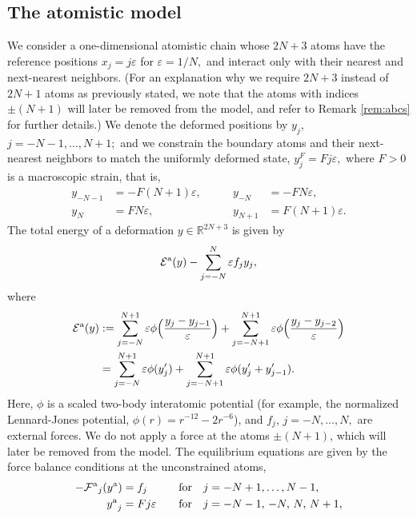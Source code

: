 \documentclass[12pt,reqno]{amsart}
\begin{document}
\subsection{The atomistic model}
\label{sec:model_at}
We consider a one-dimensional atomistic chain whose $2N+3$ atoms have
the reference positions $x_j = j{\varepsilon} $ for ${\varepsilon} = 1/N,$ and interact
only with their nearest and next-nearest neighbors. (For an
explanation why we require $2N+3$ instead of $2N+1$ atoms as
previously stated, we note that the atoms with indices $\pm(N+1)$ will
later be removed from the model, and refer to Remark \ref{rem:abcs}
for further details.) We denote the deformed positions by $y_j$,
$j=-N-1,\dots,N+1;$ and we constrain the boundary atoms and their
next-nearest neighbors to match the uniformly deformed state, $y_j^F =
Fj{\varepsilon} ,$ where $F>0$ is a macroscopic strain,
that is,
\begin{equation}\label{bc}
\begin{aligned}
  y_{-N-1}&=-F(N+1){\varepsilon},\qquad &y_{-N}&=-F N {\varepsilon},\\
y_{N}&=FN{\varepsilon},\qquad &y_{N+1}&=F(N+1){\varepsilon}.
\end{aligned}
\end{equation}
The total energy
of a deformation ${y} \in \mathbb{R}^{2N+3}$ is given by
\begin{equation*}
  {{\mathcal{E}}^{{\rm a}}}({y}) -\sum_{j=-N}^{N}{\varepsilon} f_j y_j,
\end{equation*}
where
\begin{equation}\label{atomaa}
\begin{split}
{{\mathcal{E}}^{{\rm a}}}({y})&:=
\sum_{j=-N}^{N+1} {\varepsilon} \phi\Big(\frac{y_{j} - y_{j-1}}{\varepsilon} \Big)
+ \sum_{j = -N+1}^{N+1} {\varepsilon} \phi\Big(\frac{y_{j} - y_{j-2}}{\varepsilon}\Big)\\
&=\sum_{j=-N}^{N+1} {\varepsilon} \phi(y_j')
+ \sum_{j = -N+1}^{N+1} {\varepsilon} \phi(y_j'+y_{j-1}').
\end{split}
\end{equation}
Here, $\phi$ is a scaled two-body interatomic potential (for example,
the normalized Lennard-Jones potential, $\phi(r) = r^{-12}-2 r^{-6}$),
and $f_j$, $j = -N, \dots, N,$ are external forces. We do not apply a
force at the atoms $\pm(N+1)$, which will later be removed from the
model. The equilibrium equations are given by the force balance
conditions at the unconstrained atoms,
\begin{equation}
\label{full}
\begin{aligned}
-{{\mathcal{F}}^{{\rm a}}}_j({y^{{\rm a}}}) &= f_j&\quad&\text{for} \quad j = -N+1, \dots, N-1,\\
{y^{{\rm a}}}_{j}&=Fj{\varepsilon}&\quad&\text{for} \quad j = -N-1,\,-N,\,N,\,N+1,
\end{aligned}
\end{equation}
\end{document}
